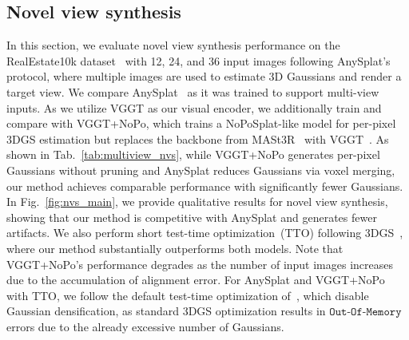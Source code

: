 \subsection{Novel view synthesis}
In this section, we evaluate novel view synthesis performance on the RealEstate10k dataset~\cite{zhou2018stereo} with 12, 24, and 36 input images following AnySplat's~\cite{jiang2025anysplat} protocol, where multiple images are used to estimate 3D Gaussians and render a target view. We compare AnySplat~\cite{jiang2025anysplat} as it was trained to support multi-view inputs. As we utilize VGGT as our visual encoder, we additionally train and compare with VGGT+NoPo, which trains a NoPoSplat-like model for per-pixel 3DGS estimation but replaces the backbone from MASt3R~\cite{leroy2024grounding} with VGGT~\cite{wang2025vggt}.  As shown in Tab.~\ref{tab:multiview_nvs}, while VGGT+NoPo generates per-pixel Gaussians without pruning and AnySplat reduces Gaussians via voxel merging, our method achieves comparable performance with significantly fewer Gaussians. In Fig.~\ref{fig:nvs_main}, we provide qualitative results for novel view synthesis, showing that our method is competitive with AnySplat and generates fewer artifacts. We also perform short test-time optimization~(TTO) following 3DGS~\cite{kerbl20233d}, where our method substantially outperforms both models. Note that VGGT+NoPo's performance degrades as the number of input images increases due to the accumulation of alignment error. For AnySplat and VGGT+NoPo with TTO, we follow the default test-time optimization of~\cite{jiang2025anysplat}, which disable Gaussian densification, as standard 3DGS optimization results in $\texttt{Out-Of-Memory}$ errors due to the already excessive number of Gaussians.

